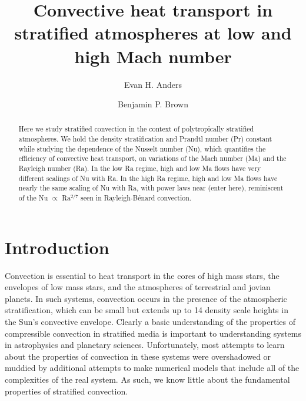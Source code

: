 \documentclass[aps, prl, twocolumn, groupedaddress, amsfonts, amssymb, amsmath]{revtex4-1}
\newcommand{\RB}{Rayleigh-B\'{e}nard }
\begin{document}
\author{Evan H. Anders}
\author{Benjamin P. Brown}
\title{Convective heat transport in stratified atmospheres at low and high Mach number}

\begin{abstract}
Here we study stratified convection in the context of polytropically stratified atmospheres. 
We hold the density stratification and Prandtl number (Pr) constant while studying the dependence
of the Nusselt number (Nu), which quantifies the efficiency of convective heat transport, on
variations of the Mach number (Ma) and the Rayleigh number (Ra).  In the low Ra regime, high and
low Ma flows have very different scalings of Nu with Ra.  In the high Ra regime, high and low Ma flows
have nearly the same scaling of Nu with Ra, with power laws near (enter here), reminiscent of the
Nu $\propto$ Ra$^{2/7}$ seen in \RB convection.
\end{abstract}
\maketitle


\section{Introduction}
\label{sec:intro}
Convection is essential to heat transport in the cores of high mass stars, the
envelopes of low mass stars, and the atmospheres of terrestrial and jovian planets. In such systems, convection
occurs in the presence of the atmospheric stratification, which can be small but extends up to 
14 density scale heights in the Sun's convective envelope.
Clearly a basic understanding of the
properties of compressible convection in stratified media is important to understanding systems in astrophysics
and planetary sciences.  Unfortunately, most attempts to learn about the properties of convection in these
systems were overshadowed or muddied by additional attempts to make numerical models that include all of the
complexities of the real system.  As such, we know little about the fundamental properties of stratified convection.
\end{document}
